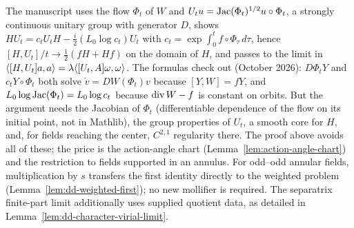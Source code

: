 \begin{remark}
The manuscript uses the flow $\Phi_t$ of $W$ and
$U_tu=\operatorname{Jac}(\Phi_t)^{1/2}u\circ\Phi_t$, a strongly continuous unitary group with generator
$D$, shows $HU_t=c_tU_tH-\tfrac i2(L_0\log c_t)U_t$ with
$c_t=\exp\int_0^tf\circ\Phi_\tau\,d\tau$, hence $[H,U_t]/t\to\tfrac12(fH+Hf)$ on the domain
of $H$, and passes to the limit in $\langle [H,U_t]a,a\rangle=\lambda\langle [U_t,A]\omega,\omega\rangle$.
The formulas check out (October 2026): $D\Phi_tY$ and $c_tY\circ\Phi_t$ both solve
$\dot v=DW(\Phi_t)v$ because $[Y,W]=fY$, and $L_0\log\operatorname{Jac}(\Phi_t)=L_0\log c_t$ because
$\operatorname{div} W-f$ is constant on orbits. But the argument needs the Jacobian of $\Phi_t$
(differentiable dependence of the flow on its initial point, not in Mathlib), the group
properties of $U_t$, a smooth core for $H$, and, for fields
reaching the center, $C^{2,1}$ regularity there.
The proof above avoids all of these; the price is the action-angle chart
(Lemma~\ref{lem:action-angle-chart}) and the restriction to fields supported in an
annulus. For odd--odd annular fields, multiplication by $s$ transfers the first
identity directly to the weighted problem
(Lemma~\ref{lem:dd-weighted-first}); no new mollifier is required.
The separatrix finite-part limit additionally uses supplied quotient data,
as detailed in Lemma~\ref{lem:dd-character-virial-limit}.
\end{remark}
